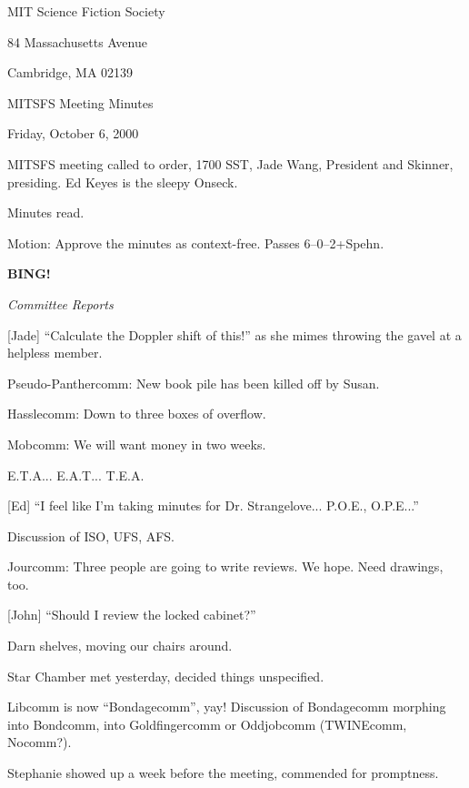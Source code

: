\documentclass[12pt]{article}
\newcommand{\bing}{{\bf BING!} }
\newcommand{\goto}[1]{\bing \vskip 12pt \centerline{{\em{#1}}}}
\begin{document}
\begin{center}

MIT Science Fiction Society 

84 Massachusetts Avenue

Cambridge, MA 02139

\vspace{12pt}

MITSFS Meeting Minutes 

Friday, October 6, 2000

\end{center}
 
\vspace{18pt}

\setlength{\parskip}{6pt}

\noindent
MITSFS meeting called to order, 1700 SST, Jade Wang, President and
Skinner, presiding.  Ed Keyes is the sleepy Onseck.

Minutes read.

Motion: Approve the minutes as context-free.  Passes 6--0--2+Spehn.

\goto{Committee Reports}

[Jade] ``Calculate the Doppler shift of this!'' as she mimes throwing
the gavel at a helpless member.

Pseudo-Panthercomm: New book pile has been killed off by Susan.

Hasslecomm: Down to three boxes of overflow.

Mobcomm: We will want money in two weeks.

E.T.A... E.A.T... T.E.A.

[Ed] ``I feel like I'm taking minutes for Dr. Strangelove... P.O.E., 
O.P.E...''

Discussion of ISO, UFS, AFS.

Jourcomm: Three people are going to write reviews.  We hope.  Need
drawings, too.

[John] ``Should I review the locked cabinet?''

Darn shelves, moving our chairs around.

Star Chamber met yesterday, decided things unspecified.

Libcomm is now ``Bondagecomm'', yay!  Discussion of Bondagecomm morphing
into Bondcomm, into Goldfingercomm or Oddjobcomm (TWINEcomm, Nocomm?).


Stephanie showed up a week before the meeting, commended for promptness.
\end{document}
